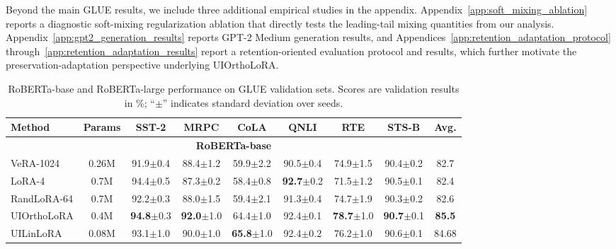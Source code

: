 \documentclass{article}
\begin{document}
Beyond the main GLUE results, we include three additional empirical studies in
the appendix. Appendix~\ref{app:soft_mixing_ablation} reports a diagnostic
soft-mixing regularization ablation that directly tests the leading-tail
mixing quantities from our analysis. Appendix~\ref{app:gpt2_generation_results}
reports GPT-2 Medium generation results, and
Appendices~\ref{app:retention_adaptation_protocol}
through~\ref{app:retention_adaptation_results} report a retention-oriented
evaluation protocol and results, which further motivate the
preservation-adaptation perspective underlying UIOrthoLoRA.

\begin{table}[ht]
\centering
\caption{RoBERTa-base and RoBERTa-large performance on GLUE validation sets. Scores are validation results in \%; “$\pm$” indicates standard deviation over seeds.}
\label{tab:glue_results_base_large}
\begin{adjustbox}{max width=\linewidth}
\begin{tabular}{@{}lcccccccc@{}}
\toprule
\textbf{Method} & \textbf{Params} & \textbf{SST-2} & \textbf{MRPC} & \textbf{CoLA} & \textbf{QNLI} & \textbf{RTE} & \textbf{STS-B} & \textbf{Avg.} \\
\midrule

\multicolumn{9}{c}{\textbf{RoBERTa-base}} \\
\midrule
VeRA-1024   & 0.26M & 91.9{\scriptsize$\pm$0.4} & 88.4{\scriptsize$\pm$1.2} & 59.9{\scriptsize$\pm$2.2} & 90.5{\scriptsize$\pm$0.4} & 74.9{\scriptsize$\pm$1.5} & 90.4{\scriptsize$\pm$0.2} & 82.7  \\
LoRA-4      & 0.7M  & 94.4{\scriptsize$\pm$0.5} & 87.3{\scriptsize$\pm$0.2} & 58.4{\scriptsize$\pm$0.8} & \textbf{92.7}{\scriptsize$\pm$0.2} & 71.5{\scriptsize$\pm$1.2} & 90.5{\scriptsize$\pm$0.1} & 82.4  \\
RandLoRA-64 & 0.7M  & 92.2{\scriptsize$\pm$0.3} & 88.0{\scriptsize$\pm$1.5} & 59.4{\scriptsize$\pm$2.1} & 91.3{\scriptsize$\pm$0.4} & 74.7{\scriptsize$\pm$1.9} & 90.3{\scriptsize$\pm$0.2} & 82.6  \\
\addlinespace
UIOrthoLoRA & 0.4M  & \textbf{94.8}{\scriptsize$\pm$0.3} & \textbf{92.0}{\scriptsize$\pm$1.0} & 64.4{\scriptsize$\pm$1.0} & 92.4{\scriptsize$\pm$0.1} & \textbf{78.7}{\scriptsize$\pm$1.0} & \textbf{90.7}{\scriptsize$\pm$0.1} & \textbf{85.5} \\
UILinLoRA   & 0.08M & 93.1{\scriptsize$\pm$1.0} & 90.0{\scriptsize$\pm$1.0} & \textbf{65.8}{\scriptsize$\pm$1.0} & 92.4{\scriptsize$\pm$0.2} & 76.2{\scriptsize$\pm$1.0} & 90.6{\scriptsize$\pm$0.1} & 84.68 \\


\end{tabular}
\end{adjustbox}
\end{table}
\end{document}
